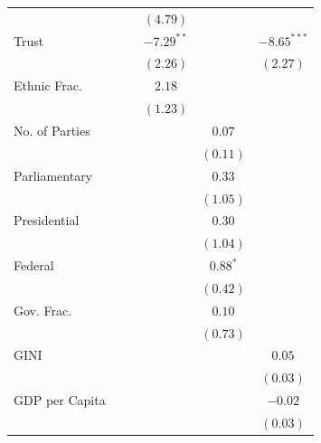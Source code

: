 \documentclass[a4paper]{article}\usepackage{graphicx, color}
\begin{document}
\begin{table}
\begin{center}
\begin{tabular}{l c c c c c }
                     &               &               & $(4.79)$      &              &               \\
Trust                &               &               & $-7.29^{**}$  &              & $-8.65^{***}$ \\
                     &               &               & $(2.26)$      &              & $(2.27)$      \\
Ethnic Frac.         &               &               & $2.18$        &              &               \\
                     &               &               & $(1.23)$      &              &               \\
No. of Parties       &               &               &               & $0.07$       &               \\
                     &               &               &               & $(0.11)$     &               \\
Parliamentary        &               &               &               & $0.33$       &               \\
                     &               &               &               & $(1.05)$     &               \\
Presidential         &               &               &               & $0.30$       &               \\
                     &               &               &               & $(1.04)$     &               \\
Federal              &               &               &               & $0.88^{*}$   &               \\
                     &               &               &               & $(0.42)$     &               \\
Gov. Frac.           &               &               &               & $0.10$       &               \\
                     &               &               &               & $(0.73)$     &               \\
GINI                 &               &               &               &              & $0.05$        \\
                     &               &               &               &              & $(0.03)$      \\
GDP per Capita       &               &               &               &              & $-0.02$       \\
                     &               &               &               &              & $(0.03)$      \\

\end{tabular}
\end{center}
\end{table}
\end{document}
